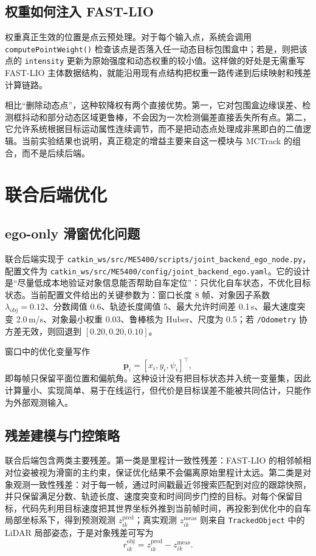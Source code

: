 \documentclass[UTF8,a4paper,12pt]{ctexart}
\begin{document}
\subsection{权重如何注入 FAST-LIO}
权重真正生效的位置是点云预处理。对于每个输入点，系统会调用 \texttt{computePointWeight()} 检查该点是否落入任一动态目标包围盒中；若是，则把该点的 \texttt{intensity} 更新为原始强度和动态权重的较小值。这样做的好处是无需重写 FAST-LIO 主体数据结构，就能沿用现有点结构把权重一路传递到后续映射和残差计算链路。

相比“删除动态点”，这种软降权有两个直接优势。第一，它对包围盒边缘误差、检测框抖动和部分动态区域更鲁棒，不会因为一次检测偏差直接丢失所有点。第二，它允许系统根据目标运动属性连续调节，而不是把动态点处理成非黑即白的二值逻辑。当前实验结果也说明，真正稳定的增益主要来自这一模块与 MCTrack 的组合，而不是后续后端。

\section{联合后端优化}
\subsection{ego-only 滑窗优化问题}
联合后端实现于 \texttt{catkin\_ws/src/ME5400/scripts/joint\_backend\_ego\_node.py}，配置文件为 \texttt{catkin\_ws/src/ME5400/config/joint\_backend\_ego.yaml}。它的设计是“尽量低成本地验证对象信息能否帮助自车定位”：只优化自车状态，不优化目标状态。当前配置文件给出的关键参数为：窗口长度 8 帧、对象因子系数 \(\lambda_{\mathrm{obj}}=0.12\)、分数阈值 0.6、轨迹长度阈值 5、最大允许时间差 0.1\,s、最大速度突变 2.0\,m/s、对象最小权重 0.03、鲁棒核为 Huber、尺度为 0.5；若 \texttt{/Odometry} 协方差无效，则回退到 \([0.20, 0.20, 0.10]\)。

窗口中的优化变量写作
\begin{equation}
\mathbf{p}_i=[x_i, y_i, \psi_i]^\top,
\end{equation}
即每帧只保留平面位置和偏航角。这种设计没有把目标状态并入统一变量集，因此计算量小、实现简单、易于在线运行，但代价是目标误差不能被共同估计，只能作为外部观测输入。

\subsection{残差建模与门控策略}
联合后端包含两类主要残差。第一类是里程计一致性残差：FAST-LIO 的相邻帧相对位姿被视为滑窗的主约束，保证优化结果不会偏离原始里程计太远。第二类是对象观测一致性残差：对于每一帧，通过时间戳最近邻搜索匹配到对应的跟踪快照，并只保留满足分数、轨迹长度、速度突变和时间同步门控的目标。对每个保留目标，代码先利用目标速度把其世界坐标外推到当前帧时间，再投影到优化中的自车局部坐标系下，得到预测观测 \(z^{\mathrm{pred}}_{ik}\)；真实观测 \(z^{\mathrm{meas}}_{ik}\) 则来自 \texttt{TrackedObject} 中的 LiDAR 局部姿态，于是对象残差可写为
\begin{equation}
r^{\mathrm{obj}}_{ik}=z^{\mathrm{pred}}_{ik}-z^{\mathrm{meas}}_{ik}.
\end{equation}
\end{document}
